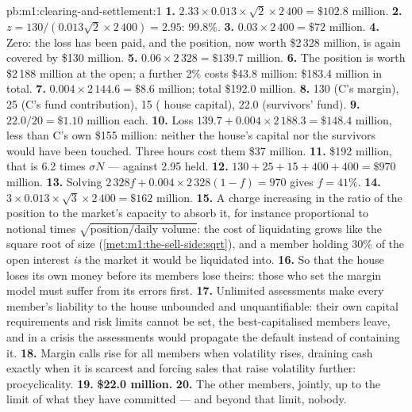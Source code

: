 \begin{solution}{pb:m1:clearing-and-settlement:1}
\textbf{1.} $2.33 \times 0.013 \times \sqrt2 \times 2\,400 = \$102.8$
million.
\textbf{2.} $z = 130/(0.013\sqrt2 \times 2\,400) = 2.95$: 99.8\%.
\textbf{3.} $0.03 \times 2\,400 = \$72$ million.
\textbf{4.} Zero: the loss has been paid, and the position, now worth
\$2\,328 million, is again covered by \$130 million.
\textbf{5.} $0.06 \times 2\,328 = \$139.7$ million.
\textbf{6.} The position is worth \$2\,188 million at the open; a further 2\%
costs \$43.8 million: \$183.4 million in total.
\textbf{7.} $0.004 \times 2\,144.6 = \$8.6$ million; total \$192.0 million.
\textbf{8.} 130 (C's margin), 25 (C's fund contribution), 15 (
house capital), 22.0 (survivors' fund).
\textbf{9.} $22.0/20 = \$1.10$ million each.
\textbf{10.} Loss $139.7 + 0.004 \times 2\,188.3 = \$148.4$ million, less
than C's own \$155 million: neither the  house's capital nor the
survivors would have been touched. Three hours cost them \$37 million.
\textbf{11.} \$192 million, that is 6.2 times $\sigma N$ --- against 2.95
held.
\textbf{12.} $130+25+15+400+400 = \$970$ million.
\textbf{13.} Solving $2\,328 f + 0.004 \times 2\,328(1-f) = 970$ gives $f =
41\%$.
\textbf{14.} $3 \times 0.013 \times \sqrt3 \times 2\,400 = \$162$ million.
\textbf{15.} A charge increasing in the ratio of the position to the market's
capacity to absorb it, for instance proportional to notional times
$\sqrt{\text{position}/\text{daily volume}}$: the cost of liquidating grows
like the square root of size (\cref{met:m1:the-sell-side:sqrt}), and a member
holding 30\% of the open interest \emph{is} the market it would be liquidated
into.
\textbf{16.} So that the  house loses its own money before its
members lose theirs: those who set the margin model must suffer from its
errors first.
\textbf{17.} Unlimited assessments make every member's liability to the
 house unbounded and unquantifiable: their own capital requirements
and risk limits cannot be set, the best-capitalised members leave, and in a
crisis the assessments would propagate the default instead of containing
it.
\textbf{18.} Margin calls rise for all members when volatility rises, draining
cash exactly when it is scarcest and forcing sales that raise volatility
further: procyclicality.
\textbf{19.} \textbf{\$22.0 million.}
\textbf{20.} The other members, jointly, up to the limit of what they have
committed --- and beyond that limit, nobody.
\end{solution}

